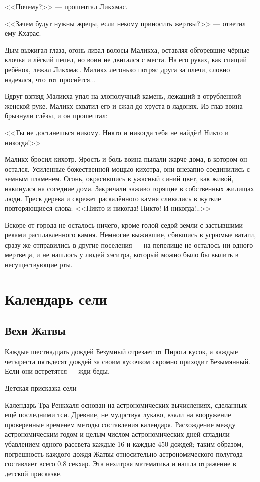 \textspace

<<Почему?>> --- прошептал Ликхмас.

<<Зачем будут нужны жрецы, если некому приносить жертвы?>> --- ответил ему Кхарас.

\textspace

Дым выжигал глаза, огонь лизал волосы Маликха, оставляя обгоревшие чёрные клочья и лёгкий пепел, но воин не двигался с места.
На его руках, как спящий ребёнок, лежал Ликхмас.
Маликх легонько потряс друга за плечи, словно надеялся, что тот проснётся...

Вдруг взгляд Маликха упал на злополучный камень, лежащий в отрубленной женской руке.
Маликх схватил его и сжал до хруста в ладонях.
Из глаз воина брызнули слёзы, и он прошептал:

<<Ты не достанешься никому.
Никто и никогда тебя не найдёт!
Никто и никогда!>>

Маликх бросил кихотр.
Ярость и боль воина пылали жарче дома, в котором он остался.
Усиленные божественной мощью кихотра, они внезапно соединились с земным пламенем.
Огонь, окрасившись в ужасный синий цвет, как живой, накинулся на соседние дома.
Закричали заживо горящие в собственных жилищах люди.
Треск дерева и скрежет раскалённого камня сливались в жуткие повторяющиеся слова: <<Никто и никогда!
Никто!
И никогда!..>>

Вскоре от города не осталось ничего, кроме голой седой земли с застывшими реками расплавленного камня.
Немногие выжившие, сбившись в угрюмые ватаги, сразу же отправились в другие поселения --- на пепелище не осталось ни одного мертвеца, и не нашлось у людей хэситра, который можно было бы вылить в несуществующие рты.

\appendix

\chapter{Календарь сели}

\section*{Вехи Жатвы}

\epigraph
{Каждые шестнадцать дождей Безумный отрезает от Пирога кусок, а каждые четыреста пятьдесят дождей за своим кусочком скромно приходит Безымянный.
Если они встретятся --- жди беды.}
{Детская присказка сели}

Календарь Тра-Ренкхаля основан на астрономических вычислениях, сделанных ещё последними тси.
Древние, не мудрствуя лукаво, взяли на вооружение проверенные временем методы составления календаря.
Расхождение между астрономическим годом и целым числом астрономических дней сгладили убавлением одного рассвета каждые 16 и каждые 450 дождей;
таким образом, погрешность каждого дождя Жатвы относительно астрономического полугода составляет всего 0.8 секхар.
Эта нехитрая математика и нашла отражение в детской присказке.

